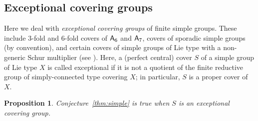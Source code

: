 \documentclass[12pt]{amsart}
\theoremstyle{plain}
\newtheorem{pro}[thm]{Proposition}
\theoremstyle{definition}
\numberwithin{equation}{section}
\newcommand{\Al}{\textup{\textsf{A}}}
\begin{document}

\subsection{Exceptional covering groups}

Here we deal with \emph{exceptional covering groups} of finite
simple groups. These include $3$-fold and $6$-fold covers of $\Al_6$
and $\Al_7$, covers of sporadic simple groups (by convention), and
certain covers of simple groups of Lie type with a non-generic Schur
multiplier (see \cite[Table~24.3]{MT11}). Here, a (perfect central)
cover $S$ of a simple group of Lie type $X$ is called exceptional if
it is not a quotient of the finite reductive group of
simply-connected type covering $X$; in particular, $S$ is a proper
cover of $X$.

\begin{pro}
\label{prop:1} Conjecture~\ref{thm:simple} is true when $S$ is an
exceptional covering group.
\end{pro}
\end{document}
